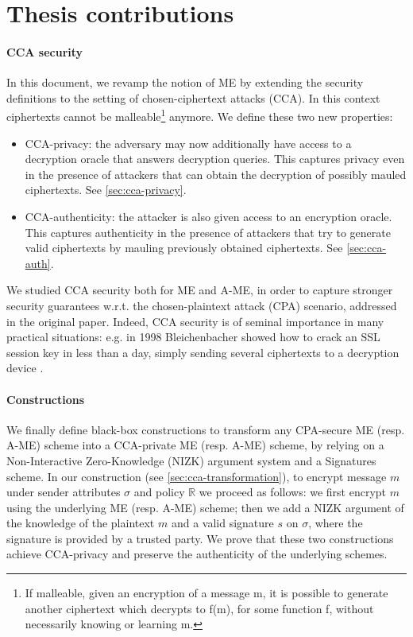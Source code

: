 \section{Thesis contributions}
\paragraph{CCA security}
In this document, we revamp the notion of ME by extending the security definitions to the setting of chosen-ciphertext attacks (CCA).
In this context ciphertexts cannot be malleable\footnote{If malleable, given an encryption of a message m, it is possible to generate another ciphertext which decrypts to f(m), for some function f, without necessarily knowing or learning m.} anymore. We define these two new properties:
\begin{itemize}
    \item CCA-privacy: the adversary may now additionally have access to a decryption oracle that answers decryption queries. This captures privacy even in the presence of attackers that can obtain the decryption of possibly mauled ciphertexts. See \ref{sec:cca-privacy}.
    \item CCA-authenticity: the attacker is also given access to an encryption oracle. This captures authenticity in the presence of attackers that try to generate valid ciphertexts by mauling previously obtained ciphertexts. See \ref{sec:cca-auth}.
\end{itemize}
We studied CCA security both for ME and A-ME, in order to capture stronger security guarantees w.r.t. the chosen-plaintext attack (CPA) scenario, addressed in the original paper.
Indeed, CCA security is of seminal importance in many practical situations: e.g. in 1998 Bleichenbacher showed how to crack an SSL session key in less than a day, simply sending several ciphertexts to a decryption device \cite{Bleichenbacher}.

\paragraph{Constructions}
We finally define black-box constructions to transform any CPA-secure ME (resp. A-ME) scheme into a CCA-private ME (resp. A-ME) scheme, by relying on a Non-Interactive Zero-Knowledge (NIZK) argument system and a Signatures scheme.
\newline\newline
In our construction (see \ref{sec:cca-transformation}), to encrypt message $m$ under sender attributes $\sigma$ and policy $\mathbb{R}$ we proceed as follows: we first encrypt $m$ using the underlying ME (resp. A-ME) scheme; then we add a NIZK argument of the knowledge of the plaintext $m$ and a valid signature $s$ on $\sigma$, where the signature is provided by a trusted party.
\newline
We prove that these two constructions achieve CCA-privacy and preserve the authenticity of the underlying schemes.
